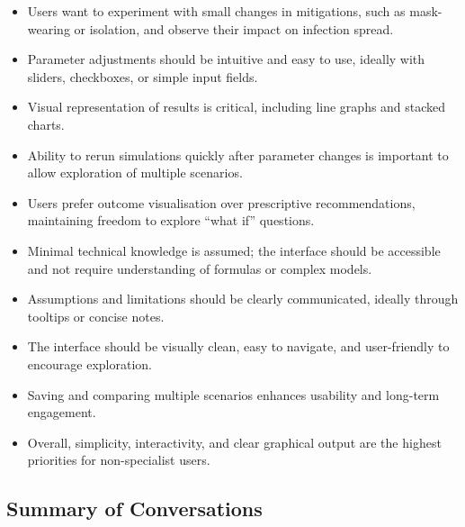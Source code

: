 \begin{itemize}
  \item Users want to experiment with small changes in mitigations, such as mask-wearing or isolation, and observe their impact on infection spread.
  \item Parameter adjustments should be intuitive and easy to use, ideally with sliders, checkboxes, or simple input fields.
  \item Visual representation of results is critical, including line graphs and stacked charts.
  \item Ability to rerun simulations quickly after parameter changes is important to allow exploration of multiple scenarios.
  \item Users prefer outcome visualisation over prescriptive recommendations, maintaining freedom to explore “what if” questions.
  \item Minimal technical knowledge is assumed; the interface should be accessible and not require understanding of formulas or complex models.
  \item Assumptions and limitations should be clearly communicated, ideally through tooltips or concise notes.
  \item The interface should be visually clean, easy to navigate, and user-friendly to encourage exploration.
  \item Saving and comparing multiple scenarios enhances usability and long-term engagement.
  \item Overall, simplicity, interactivity, and clear graphical output are the highest priorities for non-specialist users.
\end{itemize}

\subsection*{Summary of Conversations}

